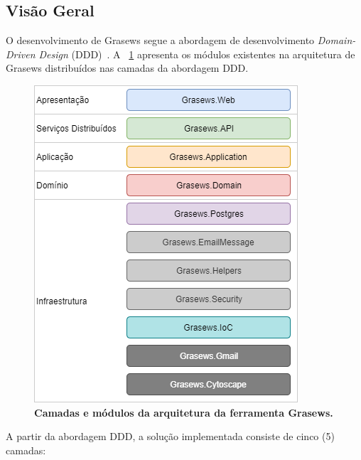 \subsection{Visão Geral}\label{4-grasews-arquitetura-visao-geral}

O desenvolvimento de Grasews segue a abordagem de desenvolvimento \textit{Domain-Driven Design} (DDD)~\cite{EVANS-2004-DDD}. 
A \figurename~\ref{fig:grasews-architectural-projects} apresenta os módulos existentes na arquitetura de Grasews distribuídos nas camadas da abordagem DDD.

\begin{figure}[h]
    \includegraphics[scale=0.7]{4-grasews/imagens/grasews-architectural-projects.png}
    \centering
    \caption[Camadas e módulos da arquitetura da ferramenta Grasews]{\textbf{Camadas e módulos da arquitetura da ferramenta Grasews.}}
    \label{fig:grasews-architectural-projects}
\end{figure}

\newpage

A partir da abordagem DDD, a solução implementada consiste de cinco (5) camadas:


